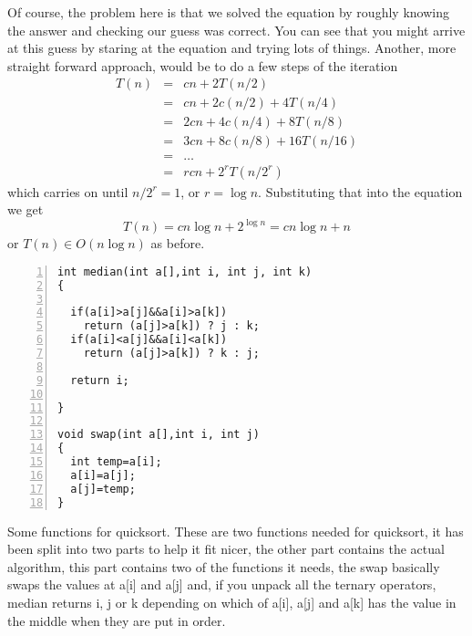 \documentclass[11pt,a4paper]{scrartcl}
\begin{document}
Of course, the problem here is that we solved the equation by roughly
knowing the answer and checking our guess was correct. You can see
that you might arrive at this guess by staring at the equation and
trying lots of things. Another, more straight forward approach, would
be to do a few steps of the iteration
\begin{eqnarray}
T(n)&=&cn+2T(n/2)\\
    &=&cn+2c(n/2)+4T(n/4)\\
    &=&2cn+4c(n/4)+8T(n/8)\\
    &=&3cn+8c(n/8)+16T(n/16)\\
    &=&\ldots\\
    &=&rcn+2^rT(n/2^r)
\end{eqnarray}
which carries on until $n/2^r=1$, or $r=\log{n}$. Substituting that into the equation we get 
\begin{equation}
T(n)=cn\log{n}+2^{\log{n}}=cn\log{n}+n
\end{equation}
or $T(n)\in O(n\log{n})$ as before. 

\begin{table}
\begin{lstlisting}[numbers=left]
int median(int a[],int i, int j, int k)
{

  if(a[i]>a[j]&&a[i]>a[k])
    return (a[j]>a[k]) ? j : k;
  if(a[i]<a[j]&&a[i]<a[k])
    return (a[j]>a[k]) ? k : j;

  return i;

}

void swap(int a[],int i, int j)
{
  int temp=a[i];
  a[i]=a[j];
  a[j]=temp;
}
\end{lstlisting}
\caption{Some functions for quicksort. These are two functions needed for quicksort, it has been split into two parts to help it fit nicer, the other part contains the actual algorithm, this part contains two of the functions it needs, the swap basically swaps the values at a[i] and a[j] and, if you unpack all the ternary operators, median returns i, j or k depending on which of a[i], a[j] and a[k] has the value in the middle when they are put in order.\label{c_quick_extras}}
\end{table}
\end{document}
